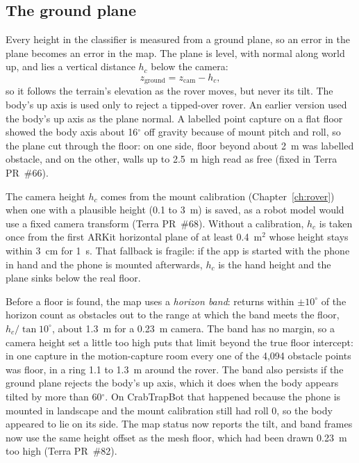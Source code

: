 \subsection{The ground plane}
\label{sec:auto-ground}

Every height in the classifier is measured from a ground plane, so an error in the plane becomes an error in the map.
The plane is level, with normal along world up, and lies a vertical distance $h_c$ below the camera:
\begin{equation}
  z_{\text{ground}} = z_{\text{cam}} - h_c,
\end{equation}
so it follows the terrain's elevation as the rover moves, but never its tilt.
The body's up axis is used only to reject a tipped-over rover.
An earlier version used the body's up axis as the plane normal.
A labelled point capture on a flat floor showed the body axis about 16$^\circ$ off gravity because of mount pitch and roll, so the plane cut through the floor: on one side, floor beyond about 2~m was labelled obstacle, and on the other, walls up to 2.5~m high read as free (fixed in Terra PR~\#66).

The camera height $h_c$ comes from the mount calibration (Chapter~\ref{ch:rover}) when one with a plausible height (0.1 to 3~m) is saved, as a robot model would use a fixed camera transform (Terra PR~\#68).
Without a calibration, $h_c$ is taken once from the first ARKit horizontal plane of at least 0.4~m$^2$ whose height stays within 3~cm for 1~s.
That fallback is fragile: if the app is started with the phone in hand and the phone is mounted afterwards, $h_c$ is the hand height and the plane sinks below the real floor.

Before a floor is found, the map uses a \emph{horizon band}: returns within $\pm10^\circ$ of the horizon count as obstacles out to the range at which the band meets the floor, $h_c/\tan 10^\circ$, about 1.3~m for a 0.23~m camera.
The band has no margin, so a camera height set a little too high puts that limit beyond the true floor intercept: in one capture in the motion-capture room every one of the 4,094 obstacle points was floor, in a ring 1.1 to 1.3~m around the rover.
The band also persists if the ground plane rejects the body's up axis, which it does when the body appears tilted by more than 60$^\circ$.
On CrabTrapBot that happened because the phone is mounted in landscape and the mount calibration still had roll 0, so the body appeared to lie on its side.
The map status now reports the tilt, and band frames now use the same height offset as the mesh floor, which had been drawn 0.23~m too high (Terra PR~\#82).

